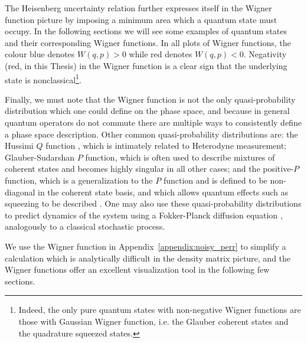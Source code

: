 The Heisenberg uncertainty relation further expresses itself in the Wigner function picture by imposing a minimum area which a quantum state must occupy. In the following sections we will see some examples of quantum states and their corresponding Wigner functions. In all plots of Wigner functions, the colour blue denotes $W\left(q, p\right) >0$ while red denotes $W \left(q, p\right) <0$. Negativity (red, in this Thesis) in the Wigner function is a clear sign that the underlying state is nonclassical\footnote{Indeed, the only pure quantum states with non-negative Wigner functions are those with Gaussian Wigner function, i.e. the Glauber coherent states and the quadrature squeezed states.}.



Finally, we must note that the Wigner function is not the only quasi-probability distribution which one could define on the phase space, and because in general quantum operators do not commute there are multiple ways to consistently define a phase space description. Other common quasi-probability distributions are: the Hussimi $Q$ function \cite{Husimi1940}, which is intimately related to Heterodyne measurement; Glauber-Sudarshan \cite{Glauber1963} $P$ function, which is often used to describe mixtures of coherent states and becomes highly singular in all other cases; and the positive-$P$ function, which is a generalization to the $P$ function and is defined to be non-diagonal in the coherent state basis, and which allows quantum effects such as squeezing to be described \cite{Walls_Millburn_Textbook}. One may also use these quasi-probability distributions to predict dynamics of the system using a Fokker-Planck diffusion equation \cite{Carmichael1999}, analogously to a classical stochastic process.

We use the Wigner function in Appendix~\ref{appendix:noisy_perr} to simplify a calculation which is analytically difficult in the density matrix picture, and the Wigner functions offer an excellent visualization tool in the following few sections.


\FloatBarrier
